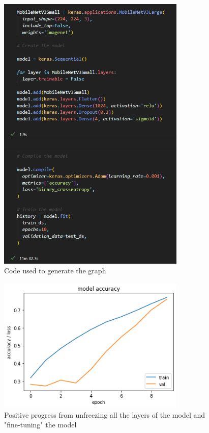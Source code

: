 \documentclass[]{final_report}
\begin{document}
\begin{figure}[ht!]
  \centering
  \includegraphics[width=0.8\textwidth]{images/training.png}
  \caption{Code used to generate the graph}
\end{figure}

\begin{figure}[ht!]
  \centering
  \includegraphics[width=0.8\textwidth]{images/positive-progress.png}
  \caption{Positive progress from unfreezing all the layers of the model and "fine-tuning" the model}
\end{figure}
\end{document}
